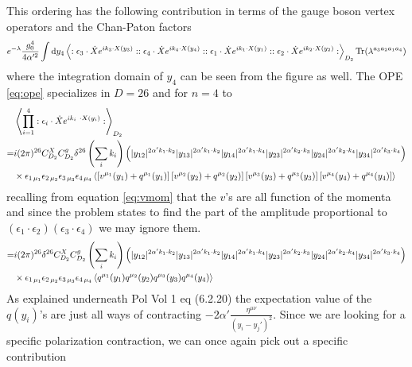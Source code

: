 \documentclass[a4paper,10pt]{article}
\renewcommand\[{\begin{equation*}}
\renewcommand\]{\end{equation*}}
\numberwithin{equation}{section}
\begin{document}
This ordering has the following contribution in terms of the gauge boson vertex operators and the Chan-Paton factors
\begin{equation}\label{eq:int}
e^{-\lambda}\frac{g_0^4}{4\alpha'^2}\int \dd y_4\expval{:\epsilon_3\cdot \dot{X} e^{ik_3\cdot X(y_3)}::\epsilon_4\cdot \dot{X} e^{ik_4\cdot X(y_4)}::\epsilon_1\cdot \dot{X} e^{ik_1\cdot X(y_1)}::\epsilon_2\cdot \dot{X} e^{ik_2\cdot X(y_2)}:}_{D_2}\Tr(\lambda^{a_3a_2a_1a_4})
\end{equation}
where the integration domain of $y_4$ can be seen from the figure as well. The OPE \ref{eq:ope} specializes in $D=26$ and for $n=4$ to
\begin{equation}
\begin{aligned}
&\expval{\prod_{i=1}^4: \epsilon_i \cdot \dot X e^{ik_i\ \cdot X(y_i)}:}_{D_2}\\
=&i(2\pi)^{26}C_{D_2}^X C_{D_2}^g\delta^{26}\left(\sum_ik_i\right)\left(|y_{12}|^{2\alpha' k_1\cdot k_2}|y_{13}|^{2\alpha' k_1\cdot k_2}|y_{14}|^{2\alpha' k_1\cdot k_4}|y_{23}|^{2\alpha' k_2\cdot k_3}|y_{24}|^{2\alpha' k_2\cdot k_4}|y_{34}|^{2\alpha' k_3\cdot k_4}\right)\\
&\times\epsilon_{1\,\mu_1}\epsilon_{2\,\mu_2}\epsilon_{3\,\mu_3}\epsilon_{4\,\mu_4}\expval{\left[v^{\mu_1}(y_1)+q^{\mu_1}(y_1)\right]\left[v^{\mu_2}(y_2)+q^{\mu_2}(y_2)\right]\left[v^{\mu_3}(y_3)+q^{\mu_3}(y_3)\right]\left[v^{\mu_4}(y_4)+q^{\mu_4}(y_4)\right]}
\end{aligned}
\end{equation}
recalling from equation \eqref{eq:vmom} that the $v$'s are all function of the momenta and since the problem states to find the part of the amplitude proportional to $(\epsilon_1\cdot \epsilon_2)(\epsilon_3\cdot \epsilon_4)$ we may ignore them.
\begin{equation}
\begin{aligned}
=&i(2\pi)^{26}\delta^{26}C_{D_2}^X C_{D_2}^g\left(\sum_ik_i\right)\left(|y_{12}|^{2\alpha' k_1\cdot k_2}|y_{13}|^{2\alpha' k_1\cdot k_2}|y_{14}|^{2\alpha' k_1\cdot k_4}|y_{23}|^{2\alpha' k_2\cdot k_3}|y_{24}|^{2\alpha' k_2\cdot k_4}|y_{34}|^{2\alpha' k_3\cdot k_4}\right)\\
&\times\epsilon_{1\,\mu_1}\epsilon_{2\,\mu_2}\epsilon_{3\,\mu_3}\epsilon_{4\,\mu_4}\expval{q^{\mu_1}(y_1)q^{\mu_2}(y_2)q^{\mu_3}(y_3)q^{\mu_4}(y_4)}
\end{aligned}
\end{equation}
As explained underneath Pol Vol 1 eq (6.2.20) the expectation value of the $q(y_i)$'s are just all ways of contracting $-2\alpha'\frac{\eta^{\mu\nu}}{(y_i-y_j')^{2}}$. Since we are looking for a specific polarization contraction, we can once again pick out a specific contribution
\end{document}
